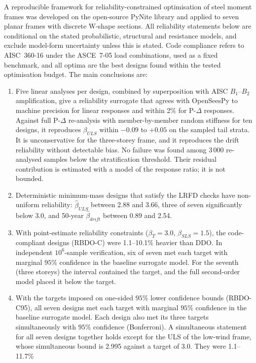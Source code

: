 A reproducible framework for reliability-constrained optimisation of steel moment frames was
developed on the open-source PyNite library and applied to seven planar frames with discrete
W-shape sections. All reliability statements below are conditional on the stated probabilistic,
structural and resistance models, and exclude model-form uncertainty unless this is stated. Code
compliance refers to AISC~360-16 under the ASCE~7-05 load combinations, used as a fixed benchmark,
and all optima are the best designs found within the tested optimisation budget. The
main conclusions are:
\begin{enumerate}
\item Five linear analyses per design, combined by superposition with AISC $B_1$--$B_2$
amplification, give a reliability surrogate that agrees with OpenSeesPy to machine precision for
linear responses and within 2\% for P-$\Delta$ responses. Against full P-$\Delta$ re-analysis with
member-by-member random stiffness for ten designs, it reproduces $\beta_{ULS}$ within $-0.09$ to
$+0.05$ on the sampled tail strata. It is unconservative for the three-storey frame, and it
reproduces the drift reliability without detectable bias. No failure was found among 3\,000
re-analysed samples below the stratification threshold. Their residual contribution is estimated
with a model of the response ratio; it is not bounded.
\item Deterministic minimum-mass designs that satisfy the LRFD checks have non-uniform reliability:
$\hat\beta_{ULS}$ between 2.88 and 3.66, three of seven significantly below 3.0, and 50-year
$\hat\beta_{drift}$ between 0.89 and 2.54.
\item With point-estimate reliability constraints ($\beta_T=3.0$, $\beta_{SLS}=1.5$), the code-compliant
designs (RBDO-C) were 1.1--10.1\% heavier than DDO. In independent $10^6$-sample verification, six of
seven met each target with marginal $95\%$ confidence in the baseline surrogate model. For the seventh (three storeys) the interval contained
the target, and the full second-order model placed it below the target.
\item With the targets imposed on one-sided $95\%$ lower confidence bounds (RBDO-C95), all seven
designs met each target with marginal $95\%$ confidence in the baseline surrogate model. Each design
also met its three targets simultaneously with $95\%$ confidence (Bonferroni). A simultaneous statement
for all seven designs together holds except for the ULS of the low-wind frame, whose simultaneous
bound is 2.995 against a target of 3.0. They were 1.1--11.7\%

\end{enumerate}
